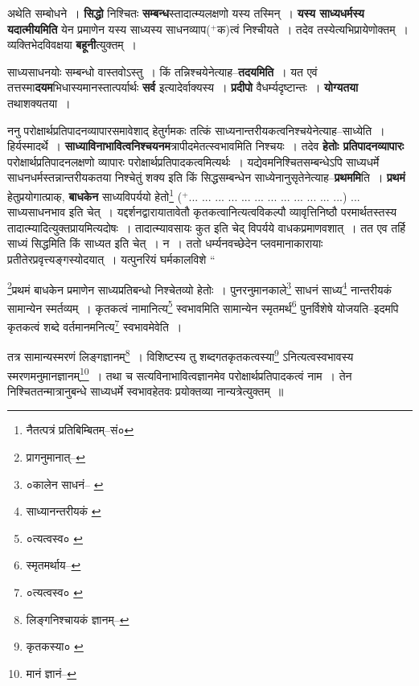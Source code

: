 \documentclass[article,12pt,a4paper]{memoir}
\newcommand{\add}[1]{($^{+}$#1)}
\begin{document}
	  \pstart अथेति सम्बोधने । \textbf{सिद्धो} निश्चितः \textbf{सम्बन्ध}स्तादात्म्यलक्षणो यस्य तस्मिन् । \textbf{यस्य साध्यधर्मस्य यदात्मीयमिति} येन प्रमाणेन यस्य साध्यस्य साधनव्याप\add{क}त्वं निश्चीयते । तदेव तस्येत्यभिप्रायेणोक्तम् । व्यक्तिभेदविवक्षया \textbf{बहूनी}त्युक्तम् ।
	\pend
      

	  \pstart साध्यसाधनयोः सम्बन्धो वास्तवोऽस्तु । किं तन्निश्चयेनेत्याह--\textbf{तदयमिति} । यत एवं तत्तस्मा\textbf{दयम}भिधास्यमानस्तात्पर्यार्थः \textbf{सर्व} इत्यादेर्वाक्यस्य । \textbf{प्रदीपो} वैधर्म्यदृष्टान्तः । \textbf{योग्यतया} तथाशक्यतया ।
	\pend
      

	  \pstart ननु परोक्षार्थप्रतिपादनव्यापारसमावेशाद् हेतुर्गमकः तत्किं साध्यनान्तरीयकत्वनिश्चयेनेत्याह--साध्येति । हिर्यस्मादर्थे । \textbf{साध्याविनाभावित्वनिश्चयनम}त्रापीदमेतत्स्वभावमिति निश्चयः । तदेव \textbf{हेतोः प्रतिपादनव्यापारः} परोक्षार्थप्रतिपादनलक्षणो व्यापारः परोक्षार्थप्रतिपादकत्वमित्यर्थः । यद्येवमनिश्चितसम्बन्धेऽपि साध्यधर्मे साधनधर्मस्तन्नान्तरीयकतया निश्चेतुं शक्य इति किं सिद्धसम्बन्धेन साध्येनानुसृतेनेत्याह--\textbf{प्रथममि}ति । \textbf{प्रथमं} हेतुप्रयोगात्प्राक्, \textbf{बाधकेन} साध्यविपर्ययो हेतो\leavevmode{}\footnote{नैतत्पत्रं प्रतिबिम्बितम्--सं०} \add{... ... ... ... ... ... ... ... ... ... ... ...} ...\leavevmode{} साध्यसाधनभाव इति चेत् । यद्दर्शनद्वारायातावेतौ कृतकत्वानित्यत्वविकल्पौ व्यावृत्तिनिष्ठौ परमार्थतस्तस्य तादात्म्यादित्युक्तप्रायमित्यदोषः । तादात्म्यावसायः कुत इति चेद् विपर्यये वाधकप्रमाणवशात् । तत एव तर्हि साध्यं सिद्धमिति किं साध्यत इति चेत् । न । ततो धर्म्यनवच्छेदेन प्लवमानाकारायाः प्रतीतेरप्रवृत्त्यङ्गस्योदयात् । यत्पुनरियं घर्मकालविशे  \leavevmode{} “
	  
	\footnote{प्रागनुमानात्--\cite{dp-msD-n}}\-प्रथमं बाधकेन प्रमाणेन साध्यप्रतिबन्धो निश्चेतव्यो हेतोः । पुनरनुमानकाले\footnote{०कालेन साधनं--\cite{dp-msA} \cite{dp-msB} \cite{dp-edP} \cite{dp-edH} \cite{dp-edE}} साधनं साध्य\footnote{साध्यानन्तरीयकं \cite{dp-msA} \cite{dp-msB} \cite{dp-edP} \cite{dp-edH} \cite{dp-edE}} नान्तरीयकं सामान्येन स्मर्तव्यम् । कृतकत्वं नामानित्य\footnote{०त्यत्वस्व० \cite{dp-msA} \cite{dp-msB} \cite{dp-edP} \cite{dp-edH} \cite{dp-edE} \cite{dp-edN}} स्वभावमिति सामान्येन स्मृतमर्थ\footnote{स्मृतमर्थाय--\cite{dp-msB}} पुनर्विशेषे योजयति--इदमपि कृतकत्वं शब्दे वर्तमानमनित्य\footnote{०त्यत्वस्व० \cite{dp-msC}} स्वभावमेवेति । 
	  
	तत्र सामान्यस्मरणं लिङ्गज्ञानम्\footnote{लिङ्गनिश्चायकं ज्ञानम्--\cite{dp-msD-n}} । विशिष्टस्य तु शब्दगतकृतकत्वस्या\footnote{कृतकस्या० \cite{dp-edH}} ऽनित्यत्वस्वभावस्य स्मरणमनुमानज्ञानम्\footnote{मानं ज्ञानं--\cite{dp-msC}} । तथा च सत्यविनाभावित्वज्ञानमेव परोक्षार्थप्रतिपादकत्वं नाम । तेन निश्चिततन्मात्रानुबन्धे साध्यधर्मे स्वभावहेतवः प्रयोक्तव्या नान्यत्रेत्युक्तम् ॥ 
	  
\end{document}
